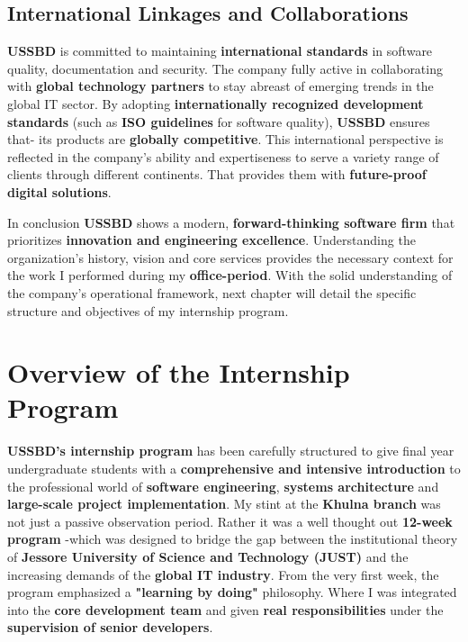 \documentclass[oneside]{thesis-library}
\begin{document}
\subsection{International Linkages and Collaborations}
\textbf{USSBD} is committed to maintaining \textbf{international standards} in software quality, documentation and security. The company fully active in collaborating with \textbf{global technology partners} to stay abreast of emerging trends in the global IT sector. By adopting \textbf{internationally recognized development standards} (such as \textbf{ISO guidelines} for software quality), \textbf{USSBD} ensures that- its products are \textbf{globally competitive}. This international perspective is reflected in the company’s ability and expertiseness to serve a variety range of clients through different continents. That provides them with \textbf{future-proof digital solutions}.

In conclusion \textbf{USSBD} shows a modern, \textbf{forward-thinking software firm} that prioritizes \textbf{innovation and engineering excellence}. Understanding the organization’s history, vision and core services provides the necessary context for the work I performed during my \textbf{office-period}. With the solid understanding of the company’s operational framework, next chapter will detail the specific structure and objectives of my internship program.

\section{Overview of the Internship Program}
\textbf{USSBD's internship program} has been carefully structured to give final year undergraduate students with a \textbf{comprehensive and intensive introduction} to the professional world of \textbf{software engineering}, \textbf{systems architecture} and \textbf{large-scale project implementation}. My stint at the \textbf{Khulna branch} was not just a passive observation period. Rather it was a well thought out \textbf{12-week program} -which was designed to bridge the gap between the institutional theory of \textbf{Jessore University of Science and Technology (JUST)} and the increasing demands of the \textbf{global IT industry}. From the very first week, the program emphasized a \textbf{"learning by doing"} philosophy. Where I was integrated into the \textbf{core development team} and given \textbf{real responsibilities} under the \textbf{supervision of senior developers}.
\end{document}

